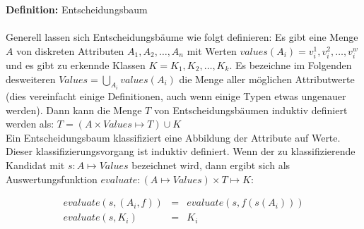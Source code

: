 \documentclass{article}
\newenvironment{definition}
    [1]
    {
        {\bf Definition:} #1\\
    }
    {}
\begin{document}
\begin{definition}{Entscheidungsbaum}\\
Generell lassen sich Entscheidungsb\"aume wie folgt definieren: Es gibt eine
Menge \(A\) von diskreten Attributen \({A_1, A_2, \dots, A_n}\) mit Werten
\(values(A_i) = {v^1_i, v^2_i, \dots, v^w_i}\) und es gibt zu erkennde
Klassen \(K = {K_1, K_2, \dots, K_k}\). Es bezeichne im Folgenden desweiteren
\(Values = \bigcup_{A_i} values(A_i)\) die Menge aller m\"oglichen 
Attributwerte (dies vereinfacht einige Definitionen, auch wenn 
einige Typen etwas ungenauer werden).
Dann kann die Menge \(T\) von Entscheidungsb\"aumen induktiv definiert werden 
als:
\( T = (A \times Values \mapsto T) \cup K\)\\
Ein Entscheidungsbaum klassifiziert eine Abbildung der Attribute auf Werte.
Dieser klassifizierungsvorgang ist induktiv definiert. Wenn der
zu klassifizierende Kandidat mit \(s : A \mapsto Values\)
bezeichnet wird, dann ergibt sich als Auswertungsfunktion
\(evaluate : (A \mapsto Values) \times T \mapsto K\):

\begin{align}
evaluate(s, (A_i, f)) &=& evaluate(s, f(s(A_i)))\\
evaluate(s, K_i) &=& K_i
\end{align}
\end{definition}
\end{document}
